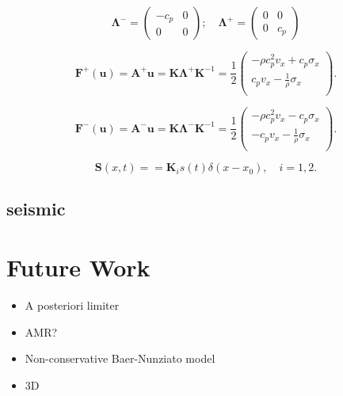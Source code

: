 \documentclass[a5paper]{article}
\begin{document}
\begin{equation}
  \pmb \Lambda^- =
  \begin{pmatrix}
    -c_p & 0\\
    0 & 0
  \end{pmatrix}; \quad
  \pmb \Lambda^+ =
  \begin{pmatrix}
    0 & 0\\
    0 & c_p
  \end{pmatrix}
\end{equation}

\begin{equation}
  \pmb F^+ (\pmb u ) =  \pmb A^+ \pmb u 
  = \pmb K \pmb \Lambda^+ \pmb K^{-1} = \frac 12
  \begin{pmatrix}
     -\rho c_p^2 v_x + c_p \sigma_x \\
     c_p v_x - \frac 1\rho \sigma_x \\
  \end{pmatrix}.
\end{equation}

\begin{equation}
  \pmb F^- (\pmb u ) =  \pmb A^- \pmb u 
  = \pmb K \pmb \Lambda^- \pmb K^{-1} = \frac 12
  \begin{pmatrix}
     -\rho c_p^2 v_x - c_p \sigma_x \\
     - c_p v_x - \frac 1\rho \sigma_x \\
  \end{pmatrix}.
\end{equation}


\begin{equation}
  \pmb S (x,t) = 
  = \pmb K_i s(t) \delta(x-x_0),\quad i=1,2.
\end{equation}
\subsection{seismic}\label{sec:seismic}


\section{Future Work}
\begin{itemize}
  \item A posteriori limiter
  \item AMR?
  \item Non-conservative Baer-Nunziato model
  \item 3D
\end{itemize}


\clearpage
\end{document}
